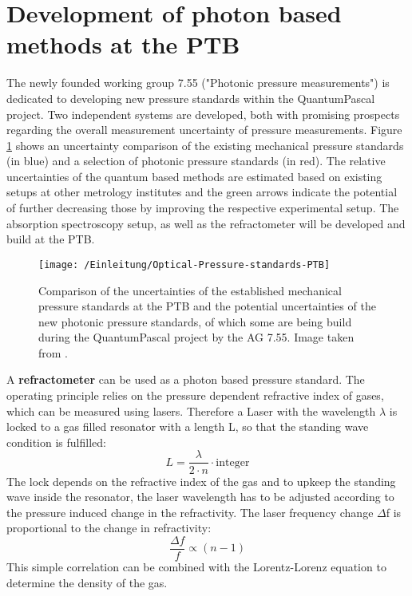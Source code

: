 \section{Development of photon based methods at the PTB}
The newly founded working group 7.55 ("Photonic pressure measurements") is dedicated to developing new pressure standards within the QuantumPascal project. Two independent systems are developed, both with promising prospects regarding the overall measurement uncertainty of pressure measurements. Figure \ref{Pressure_standards_photonic} shows an uncertainty comparison of the existing mechanical pressure standards (in blue) and a selection of photonic pressure standards (in red). The relative uncertainties of the quantum based methods are estimated based on existing setups at other metrology institutes and the green arrows indicate the potential of further decreasing those by improving the respective experimental setup. The absorption spectroscopy setup, as well as the refractometer will be developed and build at the PTB. 
\begin{figure}[H]
	\centering
	\texttt{[image: /Einleitung/Optical-Pressure-standards-PTB]}
	\caption{Comparison of the uncertainties of the established mechanical pressure standards at the PTB and the potential uncertainties of the new photonic pressure standards, of which some are being build during the QuantumPascal project by the AG 7.55. Image taken from \cite{Rubin2016}.}
	\label{Pressure_standards_photonic}
\end{figure}
\noindent
A \textbf{refractometer} can be used as a photon based pressure standard. The operating principle relies on the pressure dependent refractive index of gases, which can be measured using lasers. Therefore a Laser with the wavelength $\lambda$ is locked to a gas filled resonator with a length L, so that the standing wave condition is fulfilled:
\begin{equation}
L= \frac{\lambda}{2\cdot n}\cdot \text{integer}
\label{standing-wave-condition}
\end{equation}
The lock depends on the refractive index of the gas and to upkeep the standing wave inside the resonator, the laser wavelength has to be adjusted according to the pressure induced change in the refractivity. The laser frequency change $\Delta$f is proportional to the change in refractivity:
\begin{equation}
\frac{\Delta f}{f} \propto (n-1)
\label{standing-wave-condition}
\end{equation}
This simple correlation can be combined with the Lorentz-Lorenz equation to determine the density of the gas. 
